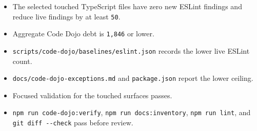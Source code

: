 \begin{itemize}
\tightlist
\item
  The selected touched TypeScript files have zero new ESLint findings and reduce live findings by at least \texttt{5\allowbreak{}0}.
\item
  Aggregate Code Dojo debt is \texttt{1\allowbreak{},\allowbreak{}8\allowbreak{}4\allowbreak{}6} or lower.
\item
  \texttt{s\allowbreak{}c\allowbreak{}r\allowbreak{}i\allowbreak{}p\allowbreak{}t\allowbreak{}s\allowbreak{}/\allowbreak{}c\allowbreak{}o\allowbreak{}d\allowbreak{}e\allowbreak{}-\allowbreak{}d\allowbreak{}o\allowbreak{}j\allowbreak{}o\allowbreak{}/\allowbreak{}b\allowbreak{}a\allowbreak{}s\allowbreak{}e\allowbreak{}l\allowbreak{}i\allowbreak{}n\allowbreak{}e\allowbreak{}s\allowbreak{}/\allowbreak{}e\allowbreak{}s\allowbreak{}l\allowbreak{}i\allowbreak{}n\allowbreak{}t\allowbreak{}.\allowbreak{}j\allowbreak{}s\allowbreak{}o\allowbreak{}n} records the lower live ESLint count.
\item
  \texttt{d\allowbreak{}o\allowbreak{}c\allowbreak{}s\allowbreak{}/\allowbreak{}c\allowbreak{}o\allowbreak{}d\allowbreak{}e\allowbreak{}-\allowbreak{}d\allowbreak{}o\allowbreak{}j\allowbreak{}o\allowbreak{}-\allowbreak{}e\allowbreak{}x\allowbreak{}c\allowbreak{}e\allowbreak{}p\allowbreak{}t\allowbreak{}i\allowbreak{}o\allowbreak{}n\allowbreak{}s\allowbreak{}.\allowbreak{}m\allowbreak{}d} and \texttt{p\allowbreak{}a\allowbreak{}c\allowbreak{}k\allowbreak{}a\allowbreak{}g\allowbreak{}e\allowbreak{}.\allowbreak{}j\allowbreak{}s\allowbreak{}o\allowbreak{}n} report the lower ceiling.
\item
  Focused validation for the touched surfaces passes.
\item
  \texttt{n\allowbreak{}p\allowbreak{}m\allowbreak{} \allowbreak{}r\allowbreak{}u\allowbreak{}n\allowbreak{} \allowbreak{}c\allowbreak{}o\allowbreak{}d\allowbreak{}e\allowbreak{}-\allowbreak{}d\allowbreak{}o\allowbreak{}j\allowbreak{}o\allowbreak{}:\allowbreak{}v\allowbreak{}e\allowbreak{}r\allowbreak{}i\allowbreak{}f\allowbreak{}y}, \texttt{n\allowbreak{}p\allowbreak{}m\allowbreak{} \allowbreak{}r\allowbreak{}u\allowbreak{}n\allowbreak{} \allowbreak{}d\allowbreak{}o\allowbreak{}c\allowbreak{}s\allowbreak{}:\allowbreak{}i\allowbreak{}n\allowbreak{}v\allowbreak{}e\allowbreak{}n\allowbreak{}t\allowbreak{}o\allowbreak{}r\allowbreak{}y}, \texttt{n\allowbreak{}p\allowbreak{}m\allowbreak{} \allowbreak{}r\allowbreak{}u\allowbreak{}n\allowbreak{} \allowbreak{}l\allowbreak{}i\allowbreak{}n\allowbreak{}t}, and \texttt{g\allowbreak{}i\allowbreak{}t\allowbreak{} \allowbreak{}d\allowbreak{}i\allowbreak{}f\allowbreak{}f\allowbreak{} \allowbreak{}-\allowbreak{}-\allowbreak{}c\allowbreak{}h\allowbreak{}e\allowbreak{}c\allowbreak{}k} pass before review.
\end{itemize}

